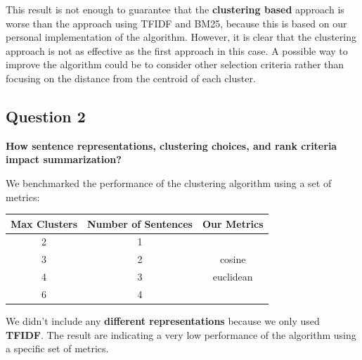 This result is not enough to guarantee that the \textbf{clustering based} approach is
worse than the approach using TFIDF and BM25, because this is based on our
personal implementation of the algorithm. However, it is clear that the
clustering approach is not as effective as the first approach in this case. A
possible way to improve the algorithm could be to consider other selection criteria rather than focusing on the distance from the centroid of each cluster.

\subsection{Question 2}
\textbf{How sentence representations, clustering choices, and rank criteria impact summarization?}

We benchmarked the performance of the clustering algorithm using a set of
metrics:
\begin{table}[H]
  \centering
  \begin{tabular}{|c|c|c|}
    \hline
    \textbf{Max Clusters} & \textbf{Number of Sentences} & \textbf{Our Metrics} \\
    \hline
    2                     & 1                            &                      \\
    3                     & 2                            & cosine               \\
    4                     & 3                            & euclidean            \\
    6                     & 4                            &                      \\
   \hline
  \end{tabular}
\end{table}

We didn't include any \textbf{different representations} because we only used \textbf{TFIDF}. The result are indicating a very low
performance of the algorithm using a specific set of metrics.

